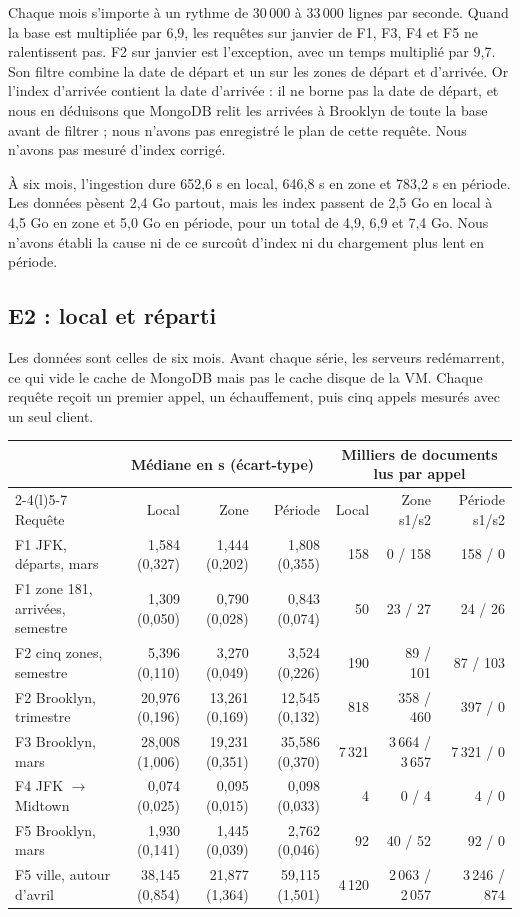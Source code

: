 Chaque mois s'importe à un rythme de 30\,000 à 33\,000 lignes par seconde. Quand la base
est multipliée par 6,9, les requêtes sur janvier de F1, F3, F4 et F5 ne ralentissent pas.
F2 sur janvier est l'exception, avec un temps multiplié par 9,7. Son filtre combine la date
de départ et un  sur les zones de départ et d'arrivée. Or l'index d'arrivée
contient la date d'arrivée : il ne borne pas la date de départ, et nous en déduisons que MongoDB relit les arrivées à Brooklyn de toute la base avant de filtrer ; nous n'avons pas enregistré le plan de cette requête. Nous n'avons pas mesuré d'index
corrigé.

À six mois, l'ingestion dure 652,6 s en local, 646,8 s en zone et 783,2 s en période. Les
données pèsent 2,4 Go partout, mais les index passent de 2,5 Go en local à 4,5 Go en zone
et 5,0 Go en période, pour un total de 4,9, 6,9 et 7,4 Go. Nous n'avons établi la cause ni
de ce surcoût d'index ni du chargement plus lent en période.

\subsection{E2 : local et réparti}\label{sec:e2}
Les données sont celles de six mois. Avant chaque série, les serveurs redémarrent, ce qui
vide le cache de MongoDB mais pas le cache disque de la VM. Chaque requête reçoit un premier
appel, un échauffement, puis cinq appels mesurés avec un seul client.

\begin{center}\footnotesize
\begin{tabular}{@{}l*{3}{r}rrr@{}}
\toprule
 & \multicolumn{3}{c}{Médiane en s (écart-type)} & \multicolumn{3}{c}{Milliers de documents lus par appel}\\
\cmidrule(lr){2-4}\cmidrule(l){5-7}
Requête & Local & Zone & Période & Local & Zone s1/s2 & Période s1/s2\\
\midrule
F1 JFK, départs, mars & 1,584 (0,327) & 1,444 (0,202) & 1,808 (0,355) & 158 & 0 / 158 & 158 / 0\\
F1 zone 181, arrivées, semestre & 1,309 (0,050) & 0,790 (0,028) & 0,843 (0,074) & 50 & 23 / 27 & 24 / 26\\
F2 cinq zones, semestre & 5,396 (0,110) & 3,270 (0,049) & 3,524 (0,226) & 190 & 89 / 101 & 87 / 103\\
F2 Brooklyn, trimestre & 20,976 (0,196) & 13,261 (0,169) & 12,545 (0,132) & 818 & 358 / 460 & 397 / 0\\
F3 Brooklyn, mars & 28,008 (1,006) & 19,231 (0,351) & 35,586 (0,370) & 7\,321 & 3\,664 / 3\,657 & 7\,321 / 0\\
F4 JFK $\to$ Midtown & 0,074 (0,025) & 0,095 (0,015) & 0,098 (0,033) & 4 & 0 / 4 & 4 / 0\\
F5 Brooklyn, mars & 1,930 (0,141) & 1,445 (0,039) & 2,762 (0,046) & 92 & 40 / 52 & 92 / 0\\
F5 ville, autour d'avril & 38,145 (0,854) & 21,877 (1,364) & 59,115 (1,501) & 4\,120 & 2\,063 / 2\,057 & 3\,246 / 874\\
\bottomrule
\end{tabular}
\end{center}

